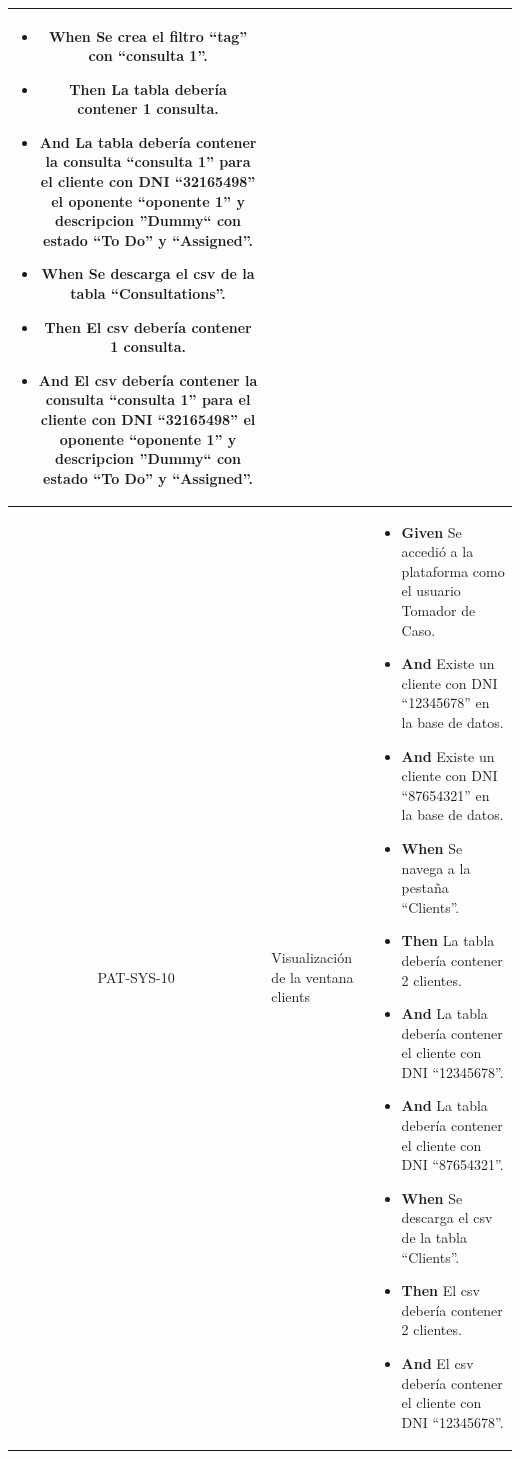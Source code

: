 \begin{longtable}{|c|p{2.5cm}|p{10.5cm}|}
\begin{itemize}
        \item \textbf{When} Se crea el filtro ``tag'' con ``consulta 1''.
        \item \textbf{Then} La tabla debería contener 1 consulta.
        \item \textbf{And} La tabla debería contener la consulta ``consulta 1'' para el cliente con DNI ``32165498'' el oponente ``oponente 1'' y descripcion ''Dummy`` con estado ``To Do'' y ``Assigned''.
        \newline
        \item \textbf{When} Se descarga el csv de la tabla ``Consultations''.
        \item \textbf{Then} El csv debería contener 1 consulta.
        \item \textbf{And} El csv debería contener la consulta ``consulta 1'' para el cliente con DNI ``32165498'' el oponente ``oponente 1'' y descripcion ''Dummy`` con estado ``To Do'' y ``Assigned''.
    \end{itemize}
    \\
    \hline
    PAT-SYS-10 & Visualización de la ventana clients &
    \begin{itemize}
        \item \textbf{Given} Se accedió a la plataforma como el usuario Tomador de Caso.
        \item \textbf{And} Existe un cliente con DNI ``12345678'' en la base de datos.
        \item \textbf{And} Existe un cliente con DNI ``87654321'' en la base de datos.
        \newline
        \item \textbf{When} Se navega a la pestaña ``Clients''.
        \newline
        \item \textbf{Then} La tabla debería contener 2 clientes.
        \item \textbf{And} La tabla debería contener el cliente con DNI ``12345678''.
        \item \textbf{And} La tabla debería contener el cliente con DNI ``87654321''.
        \newline
        \item \textbf{When} Se descarga el csv de la tabla ``Clients''.
        \newline
        \item \textbf{Then} El csv debería contener 2 clientes.
        \item \textbf{And} El csv debería contener el cliente con DNI ``12345678''.

\end{itemize}
\end{longtable}
